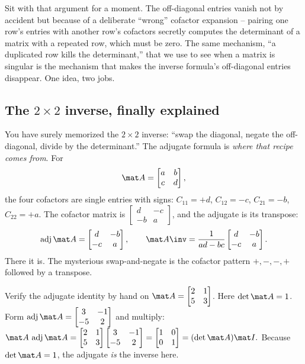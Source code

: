 \begin{aestheticbox}
Sit with that argument for a moment. The off-diagonal entries vanish not by accident but because of a
deliberate ``wrong'' cofactor expansion -- pairing one row's entries with another row's cofactors
secretly computes the determinant of a matrix with a repeated row, which must be zero. The same
mechanism, ``a duplicated row kills the determinant,'' that we use to see when a matrix is singular
is the mechanism that makes the inverse formula's off-diagonal entries disappear. One idea, two jobs.
\end{aestheticbox}

\subsection{The \texorpdfstring{$2\times2$}{2x2} inverse, finally explained}

You have surely memorized the $2\times2$ inverse: ``swap the diagonal, negate the off-diagonal, divide
by the determinant.'' The adjugate formula is \emph{where that recipe comes from}. For
\[
\mat A=\begin{bmatrix} a & b \\ c & d \end{bmatrix},
\]
the four cofactors are single entries with signs: $C_{11}=+d$, $C_{12}=-c$, $C_{21}=-b$, $C_{22}=+a$.
The cofactor matrix is $\begin{bmatrix} d & -c \\ -b & a\end{bmatrix}$, and the adjugate is its
transpose:
\[
\operatorname{adj}\mat A=\begin{bmatrix} d & -b \\ -c & a\end{bmatrix},
\qquad
\mat A\inv=\frac{1}{ad-bc}\begin{bmatrix} d & -b \\ -c & a\end{bmatrix}.
\]
There it is. The mysterious swap-and-negate is the cofactor pattern $+,-,-,+$ followed by a transpose.

\begin{labbox}
Verify the adjugate identity by hand on $\mat A=\begin{bmatrix}2&1\\5&3\end{bmatrix}$. Here $\det\mat
A=1$. Form $\operatorname{adj}\mat A=\begin{bmatrix}3&-1\\-5&2\end{bmatrix}$ and multiply: $\mat
A\,\operatorname{adj}\mat A=\begin{bmatrix}2&1\\5&3\end{bmatrix}\begin{bmatrix}3&-1\\-5&2\end{bmatrix}
=\begin{bmatrix}1&0\\0&1\end{bmatrix}=(\det\mat A)\mat I.$ Because $\det\mat A=1$, the adjugate
\emph{is} the inverse here.
\end{labbox}


